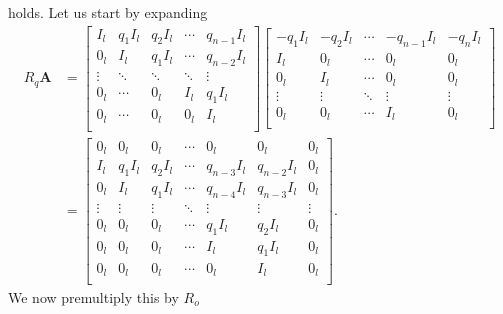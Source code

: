 holds. Let us start by expanding
\begin{equation*}
    \begin{split}
        R_q\mathbf{A} &=  
        \begin{bmatrix}
            I_l & q_1I_l & q_2I_l & \cdots & q_{n-1}I_l \\
            0_l & I_l & q_1I_l & \cdots & q_{n-2}I_l \\
            \vdots & \ddots & \ddots & \ddots & \vdots \\
            0_l & \cdots & 0_l & I_l & q_1I_l \\
            0_l & \cdots & 0_l & 0_l & I_l \\
        \end{bmatrix}
        \begin{bmatrix}
            -q_1I_l & -q_2I_l & \cdots & -q_{n-1}I_l & -q_nI_l \\
            I_l & 0_l & \cdots & 0_l & 0_l \\
            0_l & I_l & \cdots & 0_l & 0_l \\
            \vdots & \vdots & \ddots & \vdots & \vdots \\
            0_l & 0_l & \cdots & I_l & 0_l \\
        \end{bmatrix} \\
        &= 
        \begin{bmatrix}
            0_l & 0_l & 0_l & \cdots & 0_l & 0_l & 0_l \\
            I_l & q_1I_l & q_2I_l & \cdots & q_{n-3}I_l & q_{n-2}I_l & 0_l \\ 
            0_l & I_l & q_1I_l & \cdots & q_{n-4}I_l & q_{n-3}I_l & 0_l \\ 
            \vdots & \vdots & \vdots & \ddots & \vdots & \vdots & \vdots \\
            0_l & 0_l & 0_l & \cdots & q_1I_l & q_2I_l & 0_l \\
            0_l & 0_l & 0_l & \cdots & I_l & q_1I_l & 0_l \\
            0_l & 0_l & 0_l & \cdots & 0_l & I_l & 0_l \\
        \end{bmatrix}.
    \end{split} 
\end{equation*}
We now premultiply this by $R_o$

